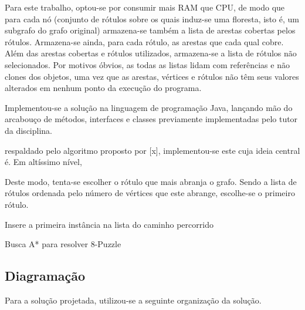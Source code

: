 \documentclass[12pt]{article}
\begin{document}
	Para este trabalho, optou-se por consumir mais RAM que CPU, de modo que para cada nó (conjunto de rótulos sobre os quais induz-se uma floresta, isto é, um subgrafo do grafo original) armazena-se também a lista de arestas cobertas pelos rótulos. Armazena-se ainda, para cada rótulo, as arestas que cada qual cobre. Além das arestas cobertas e rótulos utilizados, armazena-se a lista de rótulos não selecionados. Por motivos óbvios, as todas as listas lidam com referências e não clones dos objetos, uma vez que as arestas, vértices e rótulos não têm seus valores alterados em nenhum ponto da execução do programa.

	Implementou-se a solução na linguagem de programação Java, lançando mão do arcabouço de métodos, interfaces e classes previamente implementadas pelo tutor da disciplina.
	
	respaldado pelo algoritmo proposto por [x], implementou-se este cuja ideia central é.
	Em altíssimo nível,

	Deste modo, tenta-se escolher o rótulo que mais abranja o grafo. Sendo a lista de rótulos ordenada pelo número de vértices que este abrange, escolhe-se o primeiro rótulo.

	\begin{algorithm}[H]
		Insere a primeira instância na lista do caminho percorrido\;
		\caption{Busca A* para resolver 8-Puzzle}
	\end{algorithm}

	\subsection{Diagramação}\label{sec:diagramacao}

		Para a solução projetada, utilizou-se a seguinte organização da solução.
\end{document}
